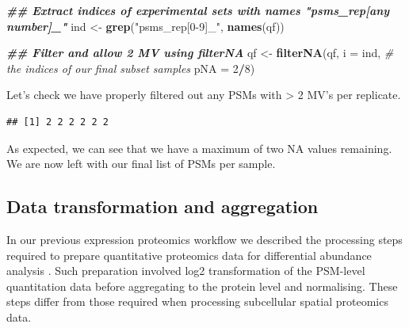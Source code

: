 \documentclass[9pt,a4paper,]{extarticle}
\newenvironment{Shaded}{\begin{snugshade}}{\end{snugshade}}
\newcommand{\AttributeTok}[1]{\textcolor[rgb]{0.13,0.29,0.53}{#1}}
\newcommand{\CommentTok}[1]{\textcolor[rgb]{0.56,0.35,0.01}{\textit{#1}}}
\newcommand{\ControlFlowTok}[1]{\textcolor[rgb]{0.13,0.29,0.53}{\textbf{#1}}}
\newcommand{\DecValTok}[1]{\textcolor[rgb]{0.00,0.00,0.81}{#1}}
\newcommand{\DocumentationTok}[1]{\textcolor[rgb]{0.56,0.35,0.01}{\textbf{\textit{#1}}}}
\newcommand{\FunctionTok}[1]{\textcolor[rgb]{0.13,0.29,0.53}{\textbf{#1}}}
\newcommand{\NormalTok}[1]{#1}
\newcommand{\OtherTok}[1]{\textcolor[rgb]{0.56,0.35,0.01}{#1}}
\newcommand{\SpecialCharTok}[1]{\textcolor[rgb]{0.81,0.36,0.00}{\textbf{#1}}}
\newcommand{\StringTok}[1]{\textcolor[rgb]{0.31,0.60,0.02}{#1}}
\begin{document}
\begin{Shaded}
\begin{Highlighting}[]
\DocumentationTok{\#\# Extract indices of experimental sets with names "psms\_rep[any number]\_"}
\NormalTok{ind }\OtherTok{\textless{}{-}} \FunctionTok{grep}\NormalTok{(}\StringTok{"psms\_rep[0{-}9]\_"}\NormalTok{, }\FunctionTok{names}\NormalTok{(qf))}

\DocumentationTok{\#\# Filter and allow 2 MV using filterNA}
\NormalTok{qf }\OtherTok{\textless{}{-}} \FunctionTok{filterNA}\NormalTok{(qf, }
               \AttributeTok{i =}\NormalTok{ ind,       }\CommentTok{\# the indices of our final subset samples}
               \AttributeTok{pNA =} \DecValTok{2}\SpecialCharTok{/}\DecValTok{8}\NormalTok{)}
\end{Highlighting}
\end{Shaded}

Let's check we have properly filtered out any PSMs with \textgreater{} 2 MV's per replicate.

\begin{Shaded}
\end{Shaded}

\begin{verbatim}
## [1] 2 2 2 2 2 2
\end{verbatim}

As expected, we can see that we have a maximum of two NA values remaining. We are
now left with our final list of PSMs per sample.

\subsection{Data transformation and aggregation}\label{data-transformation-and-aggregation}

In our previous expression proteomics workflow we described the processing steps
required to prepare quantitative proteomics data for differential abundance
analysis \citep{Hutchings2023}. Such preparation involved log2 transformation of the
PSM-level quantitation data before aggregating to the protein level and
normalising. These steps differ from those required when processing subcellular
spatial proteomics data.
\end{document}
